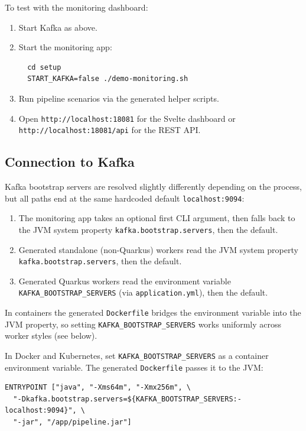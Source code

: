 To test with the monitoring dashboard:

\begin{enumerate}
\item Start Kafka as above.
\item Start the monitoring app:
  \begin{verbatim}
  cd setup
  START_KAFKA=false ./demo-monitoring.sh
  \end{verbatim}
\item Run pipeline scenarios via the generated helper scripts.
\item Open \texttt{http://localhost:18081} for the Svelte dashboard
      or \\ \texttt{http://localhost:18081/api} for the REST API.
\end{enumerate}

\subsection{Connection to Kafka}

Kafka bootstrap servers are resolved slightly differently depending on the
process, but all paths end at the same hardcoded default \texttt{localhost:9094}:

\begin{enumerate}
\item The monitoring app takes an optional first CLI argument, then falls back to
the JVM system property \texttt{kafka.bootstrap.servers}, then the default.
\item Generated standalone (non-Quarkus) workers read the JVM system property
\texttt{kafka.bootstrap.servers}, then the default.
\item Generated Quarkus workers read the environment variable
\texttt{KAFKA\_BOOTSTRAP\_SERVERS} (via \texttt{application.yml}), then the default.
\end{enumerate}

In containers the generated \texttt{Dockerfile} bridges the environment variable
into the JVM property, so setting \texttt{KAFKA\_BOOTSTRAP\_SERVERS} works uniformly
across worker styles (see below).

In Docker and Kubernetes, set \texttt{KAFKA\_BOOTSTRAP\_SERVERS} as a container
environment variable. The generated \texttt{Dockerfile} passes it to the JVM:

\begin{verbatim}
ENTRYPOINT ["java", "-Xms64m", "-Xmx256m", \
  "-Dkafka.bootstrap.servers=${KAFKA_BOOTSTRAP_SERVERS:-localhost:9094}", \
  "-jar", "/app/pipeline.jar"]
\end{verbatim}

